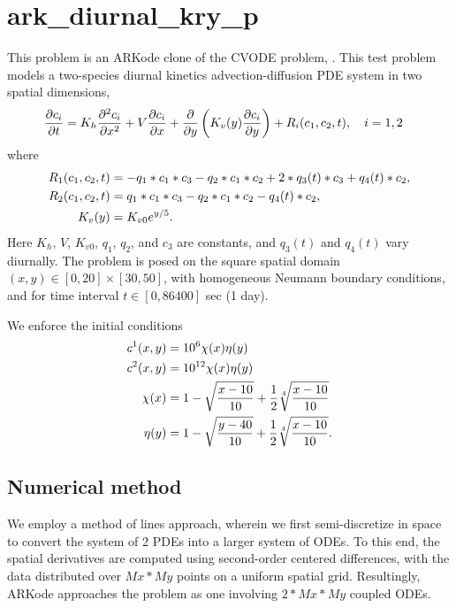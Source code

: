 \documentclass[letterpaper,10pt,english]{sphinxmanual}
\begin{document}
\section{ark\_diurnal\_kry\_p}
\label{c_parallel:id2}\label{c_parallel:ark-diurnal-kry-p}
This problem is an ARKode clone of the CVODE problem,
.  This test problem models a two-species
diurnal kinetics advection-diffusion PDE system in two spatial
dimensions,
\begin{gather}
\begin{split}\frac{\partial c_i}{\partial t} &=
  K_h \frac{\partial^2 c_i}{\partial x^2} +
  V \frac{\partial     c_i}{\partial x} +
  \frac{\partial}{\partial y}\left( K_v(y)
  \frac{\partial c_i}{\partial y}\right) +
  R_i(c_1,c_2,t),\quad i=1,2\end{split}\notag
\end{gather}
where
\begin{gather}
\begin{split}R_1(c_1,c_2,t) &= -q_1*c_1*c_3 - q_2*c_1*c_2 + 2*q_3(t)*c_3 + q_4(t)*c_2, \\
R_2(c_1,c_2,t) &=  q_1*c_1*c_3 - q_2*c_1*c_2 - q_4(t)*c_2, \\
K_v(y) &= K_{v0} e^{y/5}.\end{split}\notag
\end{gather}
Here $K_h$, $V$, $K_{v0}$, $q_1$, $q_2$,
and $c_3$ are constants, and $q_3(t)$ and $q_4(t)$
vary diurnally.  The problem is posed on the square spatial domain
$(x,y) \in [0,20]\times[30,50]$, with homogeneous Neumann
boundary conditions, and for time interval $t\in [0,86400]$ sec
(1 day).

We enforce the initial conditions
\begin{gather}
\begin{split}c^1(x,y) &=  10^6 \chi(x)\eta(y) \\
c^2(x,y) &=  10^{12} \chi(x)\eta(y) \\
\chi(x) &= 1 - \sqrt{\frac{x - 10}{10}} + \frac12 \sqrt[4]{\frac{x - 10}{10}} \\
\eta(y) &= 1 - \sqrt{\frac{y - 40}{10}} + \frac12 \sqrt[4]{\frac{x - 10}{10}}.\end{split}\notag
\end{gather}

\subsection{Numerical method}
\label{c_parallel:id3}
We employ a method of lines approach, wherein we first
semi-discretize in space to convert the system of 2 PDEs into a larger
system of ODEs.  To this end, the spatial derivatives are computed
using second-order centered differences, with the data distributed
over $Mx*My$ points on a uniform spatial grid.  Resultingly, ARKode
approaches the problem as one involving $2*Mx*My$ coupled ODEs.
\end{document}

